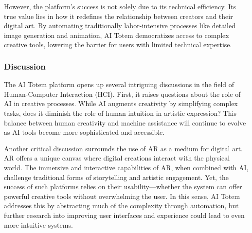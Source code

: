 However, the platform’s success is not solely due to its technical efficiency.
Its true value lies in how it redefines the relationship between creators and their digital art.
By automating traditionally labor-intensive processes like detailed image generation and animation, AI Totem democratizes access to complex creative tools, lowering the barrier for users with limited technical expertise.



\subsubsection{Discussion}

The AI Totem platform opens up several intriguing discussions in the field of Human-Computer Interaction (HCI).
First, it raises questions about the role of AI in creative processes.
While AI augments creativity by simplifying complex tasks, does it diminish the role of human intuition in artistic expression?
This balance between human creativity and machine assistance will continue to evolve as AI tools become more sophisticated and accessible.

Another critical discussion surrounds the use of AR as a medium for digital art.
AR offers a unique canvas where digital creations interact with the physical world.
The immersive and interactive capabilities of AR, when combined with AI, challenge traditional forms of storytelling and artistic engagement.
Yet, the success of such platforms relies on their usability—whether the system can offer powerful creative tools without overwhelming the user.
In this sense, AI Totem addresses this by abstracting much of the complexity through automation, but further research into improving user interfaces and experience could lead to even more intuitive systems.

